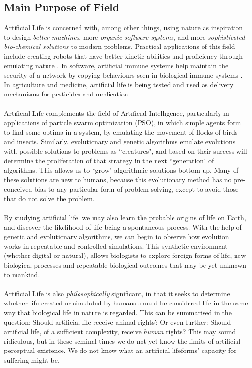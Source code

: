 \documentclass[10pt,a4paper]{article}
\begin{document}
				
				
			\subsection{Main Purpose of Field}
			
				Artificial Life is concerned with, among other things, using nature as inspiration to design \textsl{better machines}, more \textsl{organic software systems}, and more \textsl{sophisticated bio-chemical solutions} to modern problems. Practical applications of this field include creating robots that have better kinetic abilities and proficiency through emulating nature \cite{boston}. In software, artificial immune systems help maintain the security of a network by copying behaviours seen in biological immune systems \cite{immune}. In agriculture and medicine, artificial life is being tested and used as delivery mechanisms for pesticides and medication \cite{geneng}.
				\\\\
				Artificial Life complements the field of Artificial Intelligence, particularly in applications of particle swarm optimization (PSO), in which simple agents form to find some optima in a system, by emulating the movement of flocks of birds and insects. Similarly, evolutionary and genetic algorithms emulate evolutions with possible solutions to problems as ``creatures", and based on their success will determine the proliferation of that strategy in the next ``generation" of algorithms. This allows us to ``grow" algorithmic solutions bottom-up. Many of these solutions are new to humans, because this evolutionary method has no pre-conceived bias to any particular form of problem solving, except to avoid those that do not solve the problem.
				\\\\
				By studying artificial life, we may also learn the probable origins of life on Earth, and discover the likelihood of life being a spontaneous process. With the help of genetic and evolutionary algorithms, we can begin to observe how evolution works in repeatable and controlled simulations. This synthetic environment (whether digital or natural), allows biologists to explore foreign forms of life, new biological processes and repeatable biological outcomes that may be yet unknown to mankind.
				\\\\
				Artificial Life is also \textsl{philosophically} significant, in that it seeks to determine whether life created or simulated by humans should be considered life in the same way that biological life in nature is regarded. This can be summarised in the question: Should artificial life receive animal rights? Or even further: Should artificial life, of a sufficient complexity, receive \textsl{human} rights? This may sound ridiculous, but in these seminal times we do not yet know the limits of artificial perceptual existence. We do not know what an artificial lifeforms' capacity for suffering might be.
				
\end{document}
